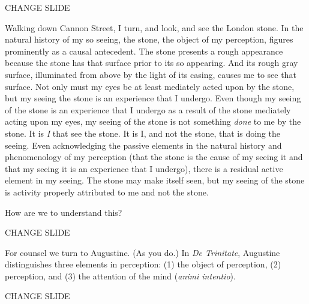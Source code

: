 \documentclass[12pt]{article}
\title{\mytitle}
\author{\myauthor}
\date{} %
\begin{document}
\maketitle

\setlength{\parindent}{1em}


CHANGE SLIDE

Walking down Cannon Street, I turn, and look, and see the London stone. In the natural history of my so seeing, the stone, the object of my perception, figures prominently as a causal antecedent. The stone presents a rough appearance because the stone has that surface prior to its so appearing. And its rough gray surface, illuminated from above by the light of its casing, causes me to see that surface. Not only must my eyes be at least mediately acted upon by the stone, but my seeing the stone is an experience that I undergo. Even though my seeing of the stone is an experience that I undergo as a result of the stone mediately acting upon my eyes, my seeing of the stone is not something \emph{done} to me by the stone. It is \emph{I} that see the stone. It is I, and not the stone, that is doing the seeing. Even acknowledging the passive elements in the natural history and phenomenology of my perception (that the stone is the cause of my seeing it and that my seeing it is an experience that I undergo), there is a residual active element in my seeing. The stone may make itself seen, but my seeing of the stone is activity properly attributed to me and not the stone.

How are we to understand this?

CHANGE SLIDE

For counsel we turn to Augustine. (As you do.) In \emph{De Trinitate}, Augustine distinguishes three elements in perception: (1) the object of perception, (2) perception, and (3) the attention of the mind (\emph{animi intentio}).

CHANGE SLIDE
\end{document}
